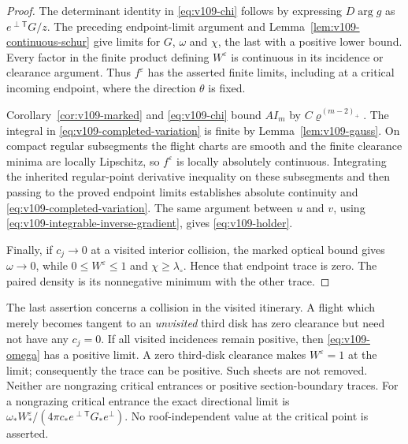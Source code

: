 \begin{proof}
The determinant identity in \eqref{eq:v109-chi} follows by
expressing $D\arg g$ as $e^{\perp\mathsf T}G/z$.
The preceding endpoint-limit argument and
Lemma~\ref{lem:v109-continuous-schur} give limits for $G$, $\omega$
and $\chi$, the last with a positive lower bound.
Every factor in the finite product defining $W^\varepsilon$ is
continuous in its incidence or clearance argument. Thus
$f^\varepsilon$ has the asserted finite limits, including at a
critical incoming endpoint, where the direction $\theta$ is fixed.

Corollary~\ref{cor:v109-marked} and \eqref{eq:v109-chi} bound
$AI_m$ by $C\varrho^{(m-2)_+}$. The integral in
\eqref{eq:v109-completed-variation} is finite by
Lemma~\ref{lem:v109-gauss}. On compact regular subsegments the flight charts are smooth and
the finite clearance minima are locally Lipschitz, so
$f^\varepsilon$ is locally absolutely continuous. Integrating the
inherited regular-point derivative inequality on these subsegments and then passing to
the proved endpoint limits establishes absolute continuity and
\eqref{eq:v109-completed-variation}. The same argument between $u$
and $v$, using \eqref{eq:v109-integrable-inverse-gradient}, gives
\eqref{eq:v109-holder}.

Finally, if $c_j\to0$ at a visited interior collision, the marked
optical bound gives $\omega\to0$, while $0\leq W^\varepsilon\leq1$
and $\chi\geq\lambda_\circ$. Hence that endpoint trace is zero.
The paired density is its nonnegative minimum with the other trace.
\end{proof}

\begin{remark}
\label{rem:v109-tangency}
The last assertion concerns a collision in the visited itinerary.
A flight which merely becomes tangent to an \emph{unvisited} third
disk has zero clearance but need not have any $c_j=0$.
If all visited incidences remain positive, then
\eqref{eq:v109-omega} has a positive limit. A zero third-disk
clearance makes $W^\varepsilon=1$ at the limit; consequently the
trace can be positive. Such sheets are not removed. Neither are
nongrazing critical entrances or positive section-boundary traces.
For a nongrazing critical entrance the exact directional limit is
$\omega_*W_*^\varepsilon/(4\pi c_*e^{\perp\mathsf T}G_*e^\perp)$.
No roof-independent value at the critical point is asserted.
\end{remark}
